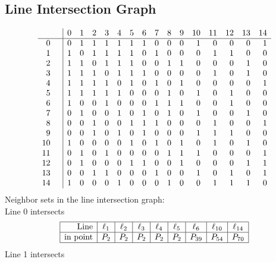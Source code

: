 \documentclass{article}
\begin{document}
{\subsection*{Line Intersection Graph}
{\arraycolsep=1pt
$$
\begin{array}{rr|*{15}r}
 &  & 0 & 1 & 2 & 3 & 4 & 5 & 6 & 7 & 8 & 9 & 10 & 11 & 12 & 13 & 14\\
\hline
0 &  & 0 & 1 & 1 & 1 & 1 & 1 & 1 & 0 & 0 & 0 & 1 & 0 & 0 & 0 & 1\\
1 &  & 1 & 0 & 1 & 1 & 1 & 1 & 0 & 1 & 0 & 0 & 0 & 1 & 1 & 0 & 0\\
2 &  & 1 & 1 & 0 & 1 & 1 & 1 & 0 & 0 & 1 & 1 & 0 & 0 & 0 & 1 & 0\\
3 &  & 1 & 1 & 1 & 0 & 1 & 1 & 1 & 0 & 0 & 0 & 0 & 1 & 0 & 1 & 0\\
4 &  & 1 & 1 & 1 & 1 & 0 & 1 & 0 & 1 & 0 & 1 & 0 & 0 & 0 & 0 & 1\\
5 &  & 1 & 1 & 1 & 1 & 1 & 0 & 0 & 0 & 1 & 0 & 1 & 0 & 1 & 0 & 0\\
6 &  & 1 & 0 & 0 & 1 & 0 & 0 & 0 & 1 & 1 & 1 & 0 & 0 & 1 & 0 & 0\\
7 &  & 0 & 1 & 0 & 0 & 1 & 0 & 1 & 0 & 1 & 0 & 1 & 0 & 0 & 1 & 0\\
8 &  & 0 & 0 & 1 & 0 & 0 & 1 & 1 & 1 & 0 & 0 & 0 & 1 & 0 & 0 & 1\\
9 &  & 0 & 0 & 1 & 0 & 1 & 0 & 1 & 0 & 0 & 0 & 1 & 1 & 1 & 0 & 0\\
10 &  & 1 & 0 & 0 & 0 & 0 & 1 & 0 & 1 & 0 & 1 & 0 & 1 & 0 & 1 & 0\\
11 &  & 0 & 1 & 0 & 1 & 0 & 0 & 0 & 0 & 1 & 1 & 1 & 0 & 0 & 0 & 1\\
12 &  & 0 & 1 & 0 & 0 & 0 & 1 & 1 & 0 & 0 & 1 & 0 & 0 & 0 & 1 & 1\\
13 &  & 0 & 0 & 1 & 1 & 0 & 0 & 0 & 1 & 0 & 0 & 1 & 0 & 1 & 0 & 1\\
14 &  & 1 & 0 & 0 & 0 & 1 & 0 & 0 & 0 & 1 & 0 & 0 & 1 & 1 & 1 & 0\\
\end{array}
$$
}%
Neighbor sets in the line intersection graph:\\
Line 0 intersects 
$$
\begin{array}{|r*{8}{|c}|}
\hline
\mbox{Line}  & \ell_{1} & \ell_{2} & \ell_{3} & \ell_{4} & \ell_{5} & \ell_{6} & \ell_{10} & \ell_{14}\\
\hline
\mbox{in point}  & P_{2} & P_{2} & P_{2} & P_{2} & P_{2} & P_{39} & P_{54} & P_{70}\\
\hline
\end{array}
$$
Line 1 intersects 
}
\end{document}
